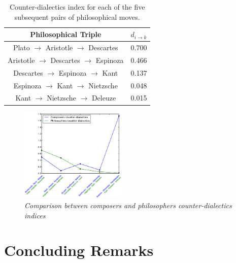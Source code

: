 \documentclass[
 aip,
 jmp,
 amsmath,amssymb,
 reprint,
]{revtex4-1}
\begin{document}
\begin{table}%
\caption{\label{tab:tablephiE} Counter-dialectics index for each
of the five subsequent pairs of philosophical moves.}

\begin{tabular}{|c||c|}
\hline
Philosophical Triple & $d_{i \rightarrow k}$ \\
\hline \hline
Plato $\rightarrow$ Aristotle $\rightarrow$ Descartes &  0.700 \\
Aristotle $\rightarrow$ Descartes $\rightarrow$ Espinoza & 0.466 \\
Descartes $\rightarrow$ Espinoza $\rightarrow$ Kant & 0.137 \\
Espinoza $\rightarrow$ Kant $\rightarrow$ Nietzsche & 0.048 \\
Kant $\rightarrow$ Nietzsche $\rightarrow$ Deleuze  & 0.015 \\
\hline
\end{tabular}
\end{table}

\begin{figure}[ht]
        \begin{center}
                \includegraphics[width=0.45\textwidth]{images/compara_dialeticas2}
        \end{center}
        \caption{\it Comparison between composers and philosophers
          counter-dialectics indices}
        \label{fig:comparingdialectics}
\end{figure}

\section{Concluding Remarks}
\end{document}
